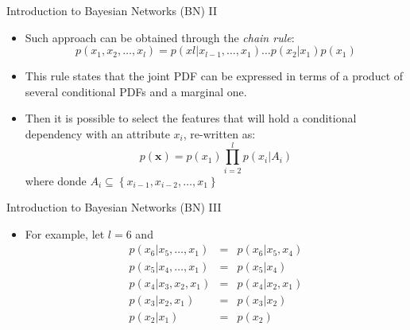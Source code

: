 \documentclass[xcolor=x11names,compress]{beamer}
\renewcommand{\(}{\begin{columns}}
\renewcommand{\)}{\end{columns}}
\newcommand{\<}[1]{\begin{column}{#1}}
\renewcommand{\>}{\end{column}}
\begin{document}
\begin{frame}{Introduction to Bayesian Networks (BN) II}
\begin{itemize}
	\item Such approach can be obtained through the \emph{chain rule}:
	\begin{equation}
	p(x_1, x_2, \ldots, x_l) = p(xl | x_{l-1}, \ldots, x_1)\ldots p(x_2 | x_1) p(x_1)
	\label{eq:regla-cadena}
	\end{equation}
	\item This rule states that the joint PDF can be expressed in terms of a product of several conditional PDFs and a marginal one.
	\item Then it is possible to select the features that will hold a conditional dependency with an attribute $x_i$, re-written as:
	\begin{equation}
	p(\mathbf{x}) = p(x_1)\prod_{i = 2}^{l}p(x_i | A_i)
	\end{equation}
	where donde $A_i \subseteq \left \{ x_{i-1}, x_{i-2}, \ldots , x_1  \right \}$
\end{itemize}
\end{frame}

\begin{frame}{Introduction to Bayesian Networks (BN) III}
\begin{itemize}
	\item For example, let $l=6$ and
	\begin{eqnarray}
p(x_6 | x_5, \ldots , x_1)	&=& p(x_6 | x_5, x_4) 	\\
p(x_5 | x_4, \ldots, x_1) 	&=& p(x_5 | x_4)		\\
p(x_4 | x_3, x_2, x_1) 		&=& p(x_4 | x_2, x_1)	\\
p(x_3 | x_2, x_1)			&=& p(x_3 | x_2)		\\
p(x_2 | x_1)				&=& p(x_2)
\end{eqnarray}
\end{itemize}

\end{frame}
\end{document}
